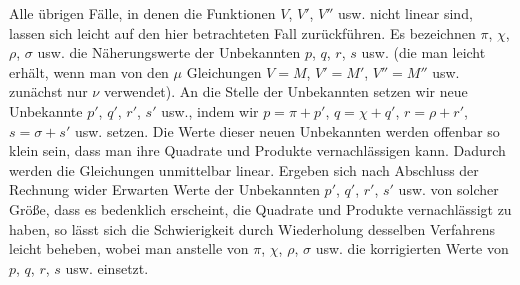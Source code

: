 Alle übrigen Fälle, in denen die Funktionen $V$, $V'$, $V''$ usw. nicht linear sind, lassen sich leicht auf den hier betrachteten Fall zurückführen. Es bezeichnen $\pi$, $\chi$, $\rho$, $\sigma$ usw. die Näherungswerte der Unbekannten $p$, $q$, $r$, $s$ usw. (die man leicht erhält, wenn man von den $\mu$ Gleichungen $V=M$, $V'=M'$, $V''=M''$ usw. zunächst nur $\nu$ verwendet). An die Stelle der Unbekannten setzen wir neue Unbekannte $p'$, $q'$, $r'$, $s'$ usw., indem wir $p=\pi+p'$, $q=\chi+q'$, $r=\rho+r'$, $s=\sigma+s'$ usw. setzen. Die Werte dieser neuen Unbekannten werden offenbar so klein sein, dass man ihre Quadrate und Produkte vernachlässigen kann. Dadurch werden die Gleichungen unmittelbar linear. Ergeben sich nach Abschluss der Rechnung wider Erwarten Werte der Unbekannten $p'$, $q'$, $r'$, $s'$ usw. von solcher Größe, dass es bedenklich erscheint, die Quadrate und Produkte vernachlässigt zu haben, so lässt sich die Schwierigkeit durch Wiederholung desselben Verfahrens leicht beheben, wobei man anstelle von $\pi$, $\chi$, $\rho$, $\sigma$ usw. die korrigierten Werte von $p$, $q$, $r$, $s$ usw. einsetzt.
